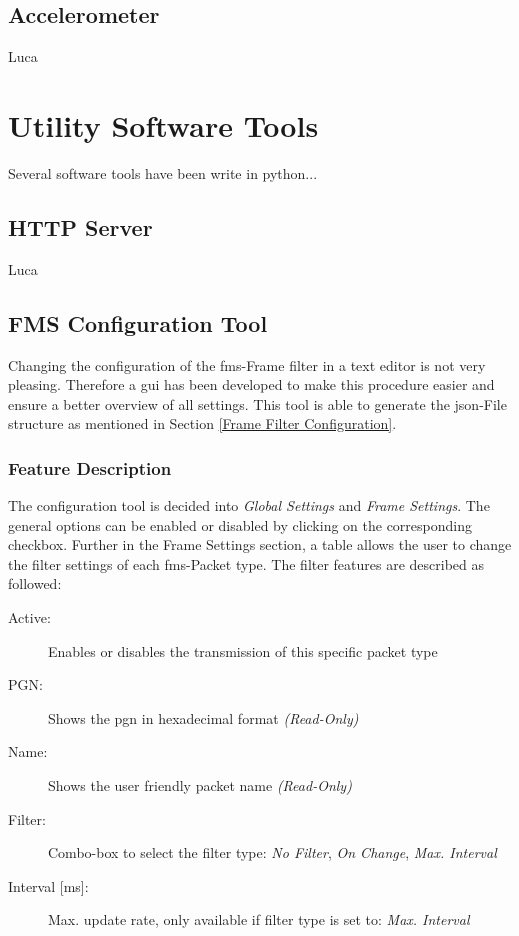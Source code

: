 
\subsection{Accelerometer}
Luca


\newpage
\section{Utility Software Tools}
Several software tools have been write in python... 

\subsection{HTTP Server}
Luca

\newpage
\subsection{FMS Configuration Tool}
Changing the configuration of the \acrshort{fms}-Frame filter in a text editor is not very pleasing. Therefore a \acrfull{gui} has been developed to make this procedure easier and ensure a better overview of all settings. This tool is able to generate the \acrshort{json}-File structure as mentioned in Section \ref{Frame Filter Configuration}.

\subsubsection{Feature Description}
The configuration tool is decided into \textit{Global Settings} and \textit{Frame Settings}. The general options can be enabled or disabled by clicking on the corresponding checkbox. Further in the Frame Settings section, a table allows the user to change the filter settings of each \acrshort{fms}-Packet type. The filter features are described as followed:

\begin{description}
  \item[Active:] Enables or disables the transmission of this specific packet type
  \item[PGN:] Shows the \acrlong{pgn} in hexadecimal format \textit{(Read-Only)}
  \item[Name:] Shows the user friendly packet name \textit{(Read-Only)}
  \item[Filter:] Combo-box to select the filter type: \textit{No Filter}, \textit{On Change}, \textit{Max. Interval}
  \item[{Interval [ms]:}] Max. update rate, only available if filter type is set to: \textit{Max. Interval}
\end{description}

